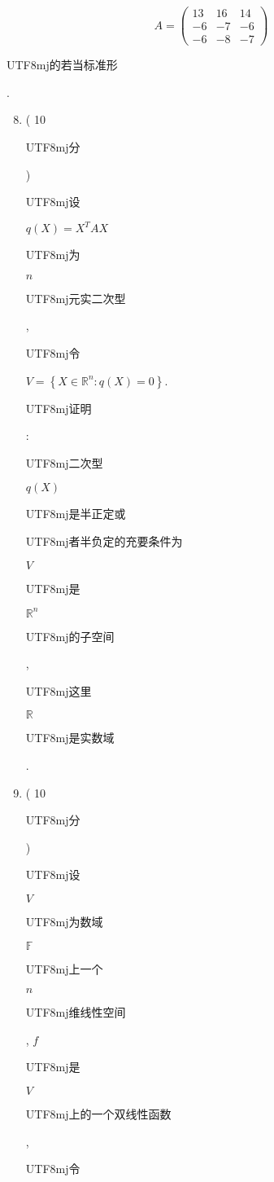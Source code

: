 \documentclass[10pt]{article}
\begin{document}
$$
A=\left(\begin{array}{ccc}
13 & 16 & 14 \\
-6 & -7 & -6 \\
-6 & -8 & -7
\end{array}\right)
$$
\begin{CJK}{UTF8}{mj}的若当标准形\end{CJK}.

\begin{enumerate}
  \setcounter{enumi}{7}
  \item ( 10 \begin{CJK}{UTF8}{mj}分\end{CJK}) \begin{CJK}{UTF8}{mj}设\end{CJK} $q(X)=X^{T} A X$ \begin{CJK}{UTF8}{mj}为\end{CJK} $n$ \begin{CJK}{UTF8}{mj}元实二次型\end{CJK}, \begin{CJK}{UTF8}{mj}令\end{CJK} $V=\left\{X \in \mathbb{R}^{n}: q(X)=0\right\}$. \begin{CJK}{UTF8}{mj}证明\end{CJK}: \begin{CJK}{UTF8}{mj}二次型\end{CJK} $q(X)$ \begin{CJK}{UTF8}{mj}是半正定或\end{CJK} \begin{CJK}{UTF8}{mj}者半负定的充要条件为\end{CJK} $V$ \begin{CJK}{UTF8}{mj}是\end{CJK} $\mathbb{R}^{n}$ \begin{CJK}{UTF8}{mj}的子空间\end{CJK}, \begin{CJK}{UTF8}{mj}这里\end{CJK} $\mathbb{R}$ \begin{CJK}{UTF8}{mj}是实数域\end{CJK}.

  \item ( 10 \begin{CJK}{UTF8}{mj}分\end{CJK}) \begin{CJK}{UTF8}{mj}设\end{CJK} $V$ \begin{CJK}{UTF8}{mj}为数域\end{CJK} $\mathbb{F}$ \begin{CJK}{UTF8}{mj}上一个\end{CJK} $n$ \begin{CJK}{UTF8}{mj}维线性空间\end{CJK}, $f$ \begin{CJK}{UTF8}{mj}是\end{CJK} $V$ \begin{CJK}{UTF8}{mj}上的一个双线性函数\end{CJK}, \begin{CJK}{UTF8}{mj}令\end{CJK}

\end{enumerate}
\end{document}
